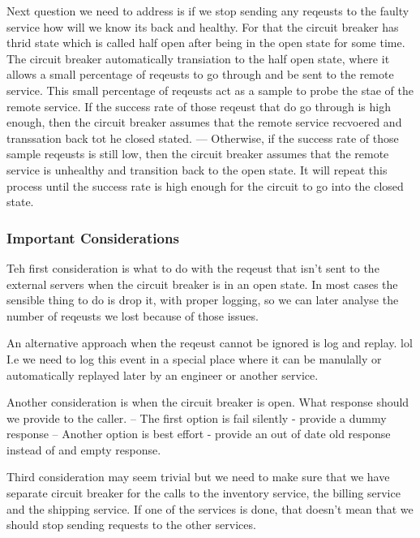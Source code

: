 \documentclass[a4paper, 11pt]{book}
\begin{document}
{    Next question we need to address is if we stop sending any reqeusts to the faulty service how will we know its back and healthy.
    For that the circuit breaker has thrid state which is called half open after being in the open state for some time.
    The circuit breaker automatically transiation to the half open state, where it allows a small percentage of reqeusts to go through and be sent to the remote service.
    This small percentage of reqeusts act as a sample to probe the stae of the remote service.
    If the success rate of those reqeust that do go through is high enough, then the circuit breaker assumes that the remote service recvoered and transsation back tot he closed stated.
    --- Otherwise, if the success rate of those sample reqeusts is still low, then the circuit breaker assumes that the remote service is unhealthy and transition back to the open state.
    It will repeat this process until the success rate is high enough for the circuit to go into the closed state.

    \subsubsection{Important Considerations}
    Teh first consideration is what to do with the reqeust that isn't sent to the external servers when the circuit breaker is in an open state.
    In most cases the sensible thing to do is drop it, with proper logging, so we can later analyse the number of reqeusts we lost because of those issues.

    An alternative approach when the reqeust cannot be ignored is log and replay. lol
    I.e we need to log this event in a special place where it can be manulally or automatically replayed later by an engineer or another service.

    Another consideration is when the circuit breaker is open.
    What response should we provide to the caller.
    -- The first option is fail silently - provide a dummy response
    -- Another option is best effort - provide an out of date old response instead of and empty response.

    Third consideration may seem trivial but we need to make sure that we have separate circuit breaker for the calls to the inventory service, the billing service and the shipping service.
    If one of the services is done, that doesn't mean that we should stop sending requests to the other services.

}
\end{document}

